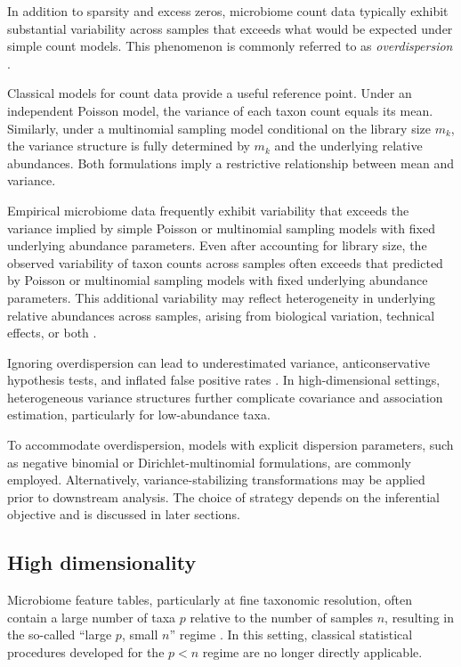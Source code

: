 In addition to sparsity and excess zeros, microbiome count data typically exhibit substantial variability across samples that exceeds what would be expected under simple count models. 
This phenomenon is commonly referred to as \emph{overdispersion} \citep{xia2024applied,weiss2017normalization}.

Classical models for count data provide a useful reference point. 
Under an independent Poisson model, the variance of each taxon count equals its mean. 
Similarly, under a multinomial sampling model conditional on the library size $m_k$, the variance structure is fully determined by $m_k$ and the underlying relative abundances. 
Both formulations imply a restrictive relationship between mean and variance.

Empirical microbiome data frequently exhibit variability that exceeds the variance implied by simple Poisson or multinomial sampling models with fixed underlying abundance parameters. 
Even after accounting for library size, the observed variability of taxon counts across samples often exceeds that predicted by Poisson or multinomial sampling models with fixed underlying abundance parameters.
This additional variability may reflect heterogeneity in underlying relative abundances across samples, arising from biological variation, technical effects, or both \citep{weiss2017normalization,xia2024applied}.

Ignoring overdispersion can lead to underestimated variance, anticonservative hypothesis tests, and inflated false positive rates \citep{anders2010differential,robinson2010edger}. In high-dimensional settings, heterogeneous variance structures further complicate covariance and association estimation, particularly for low-abundance taxa.

To accommodate overdispersion, models with explicit dispersion parameters, such as negative binomial or Dirichlet-multinomial formulations, are commonly employed. 
Alternatively, variance-stabilizing transformations may be applied prior to downstream analysis. 
The choice of strategy depends on the inferential objective and is discussed in later sections.

\subsection{High dimensionality}
\label{sec:2micro:charact:highdim}

Microbiome feature tables, particularly at fine taxonomic resolution, often contain a large number of taxa $p$ relative to the number of samples $n$, resulting in the so-called ``large $p$, small $n$'' regime \citep{xia2024applied}. In this setting, classical statistical procedures developed for the $p<n$ regime are no longer directly applicable.

